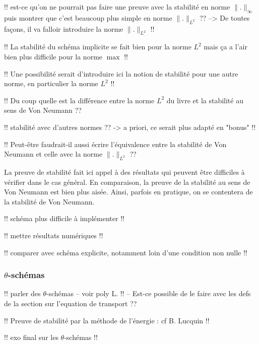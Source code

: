 \documentclass[12pt,a4paper,twoside]{article}
\begin{document}
!! est-ce qu'on ne pourrait pas faire une preuve avec la stabilit\'e en norme
$\| . \|_{\infty}$ puis montrer que c'est beaucoup plus simple
en norme $\| . \|_{L^2}$ ??
--> De toutes fa\c{c}ons, il va falloir introduire la norme $\|.\|_{L^2}$ !!

!! La stabilit\'e du sch\'ema implicite se fait bien pour la norme
$L^2$ mais \c{c}a a l'air bien plus difficile pour la norme $\max$ !!

!! Une possibilit\'e serait d'introduire ici la notion de stabilit\'e pour une autre
norme, en particulier la norme $L^2$ !!

!! Du coup quelle est la diff\'erence entre la norme $L^2$ du livre
et la stabilit\'e au sens de Von Neumann ??

!! stabilit\'e avec d'autres normes ?? -> a priori, ce serait plus adapt\'e
en "bonus" !!


!! Peut-\^etre faudrait-il aussi \'ecrire l'\'equivalence entre la stabilit\'e de
Von Neumann et celle avec la norme $\| . \|_{L^2}$ ??

\begin{remark}
  La preuve de stabilit\'e fait ici appel \`a des r\'esultats qui peuvent \^etre
  difficiles \`a v\'erifier dans le cas g\'en\'eral.
  En comparaison, la preuve de la stabilit\'e au sens de Von Neumann est bien plus ais\'ee.
  Ainsi, parfois en pratique, on se contentera de la stabilit\'e de Von Neumann.
\end{remark}


\begin{remark}
  !! sch\'ema plus difficile \`a impl\'ementer !!

  !! mettre r\'esultats num\'eriques !!

  !! comparer avec sch\'ema explicite, notamment loin d'une condition non nulle !!
\end{remark}

\subsubsection{$\theta$-sch\'emas}

!! parler des $\theta$-sch\'emas -- voir poly L. !! 
-- Est-ce possible de le faire avec les defs de la section sur l'equation de transport ??

!! Preuve de stabilit\'e par la m\'ethode de l'\'energie : cf B. Lucquin !!


!! exo final sur les $\theta$-sch\'emas !!


\end{document}
